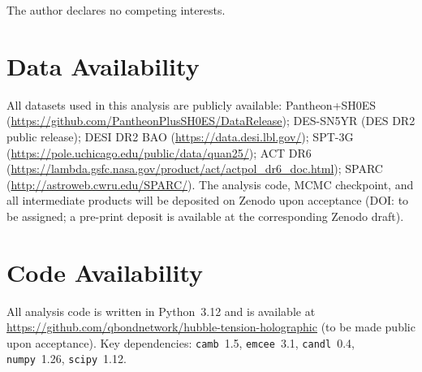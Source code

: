 \documentclass[12pt,a4paper]{article}
\begin{document}
The author declares no competing interests.

\section*{Data Availability}

All datasets used in this analysis are publicly available:
Pantheon+SH0ES (\url{https://github.com/PantheonPlusSH0ES/DataRelease});
DES-SN5YR (DES DR2 public release);
DESI DR2 BAO (\url{https://data.desi.lbl.gov/});
SPT-3G (\url{https://pole.uchicago.edu/public/data/quan25/});
ACT DR6 (\url{https://lambda.gsfc.nasa.gov/product/act/actpol_dr6_doc.html});
SPARC (\url{http://astroweb.cwru.edu/SPARC/}).
The analysis code, MCMC checkpoint, and all intermediate products
will be deposited on Zenodo upon acceptance (DOI: to be assigned;
a pre-print deposit is available at the corresponding Zenodo draft).

\section*{Code Availability}

All analysis code is written in Python~3.12 and is available at
\url{https://github.com/qbondnetwork/hubble-tension-holographic}
(to be made public upon acceptance).
Key dependencies: \texttt{camb}~1.5, \texttt{emcee}~3.1,
\texttt{candl}~0.4, \texttt{numpy}~1.26, \texttt{scipy}~1.12.
\end{document}
